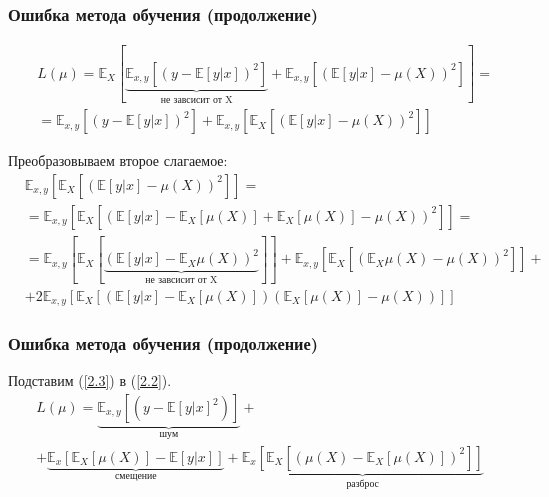 \documentclass[fleqn,pdf, 9pt, usenames, dvipsnames, unicode, hyperref={bookmarks=true,bookmarksopen=false, bookmarksnumbered}]{beamer}
\begin{document}
\begin{frame}\frametitle{Ошибка метода обучения (продолжение)}

\begin{equation}
	\begin{split}
	&L(\mu) = \mathbb{E}_X\left[\underbrace{\mathbb{E}_{x,y}\left[(y-\mathbb{E}[y|x])^2\right]}_{\text{не завсисит от X}} + \mathbb{E}_{x,y}\left[(\mathbb{E}[y|x] - \mu(X))^2\right]\right] = \\
	&= \mathbb{E}_{x,y}\left[(y-\mathbb{E}[y|x])^2\right] + \mathbb{E}_{x,y}\left[\mathbb{E}_X \left[(\mathbb{E}[y|x]- \mu(X))^2\right]\right]
\end{split}
\label{2.2}
\end{equation}

Преобразовываем второе слагаемое:
\begin{equation}
    \begin{aligned}
        &\mathbb{E}_{x,y}\left[\mathbb{E}_X \left[(\mathbb{E}[y|x] - \mu(X))^2\right]\right] = \\ 
        &= \mathbb{E}_{x,y}\left[\mathbb{E}_X \left[(\mathbb{E}[y|x] - \mathbb{E}_X[\mu(X)] + \mathbb{E}_X[\mu(X)] -\mu(X))^2\right]\right] = \\
        &=
	\mathbb{E}_{x,y}\left[\mathbb{E}_X \left[\underbrace{(\mathbb{E}[y|x] - \mathbb{E}_X \mu(X))^2}_{\text{не завсисит от X}}\right]\right] + \mathbb{E}_{x,y}\left[\mathbb{E}_X \left[(\mathbb{E}_X \mu(X) - \mu(X))^2\right]\right] + \\ 
	&+ 
	2\mathbb{E}_{x,y} \left[\mathbb{E}_X\left[(\mathbb{E}[y|x] - \mathbb{E}_X[\mu(X)])(\mathbb{E}_X[\mu(X)]-\mu(X))\right]\right]
	\label{2.3}
    \end{aligned}
\end{equation}



\end{frame}


\begin{frame}\frametitle{Ошибка метода обучения (продолжение)}

    Подставим (\ref{2.3}) в (\ref{2.2}).
    \begin{gather}
	L(\mu) = \underbrace{\mathbb{E}_{x,y}\left[(y-\mathbb{E}[y|x]^2)\right]}_{\text{шум}} + \\ +
	\underbrace{\mathbb{E}_x\left[\mathbb{E}_X[\mu(X)] - \mathbb{E}[y|x]\right]}_{\text{смещение}} + \underbrace{\mathbb{E}_x\left[\mathbb{E}_X\left[(\mu(X) - \mathbb{E}_X[\mu(X)])^2\right]\right]}_{\text{разброс}}
	\label{2.4}
\end{gather}


\end{frame}
\end{document}
